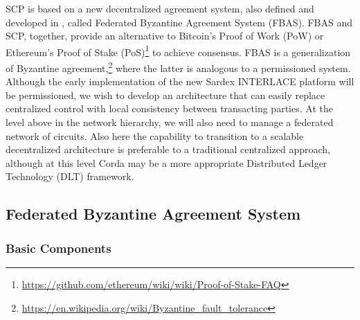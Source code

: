 SCP is based on a new decentralized agreement system, also defined and developed in \cite{Mazieres2016}, called Federated Byzantine Agreement System (FBAS). FBAS and SCP, together, provide an alternative to Bitcoin's Proof of Work (PoW) \cite{Antonopoulos2015} or Ethereum's Proof of Stake (PoS)\footnote{\url{https://github.com/ethereum/wiki/wiki/Proof-of-Stake-FAQ}} to achieve consensus. FBAS is a generalization of Byzantine agreement,\footnote{\url{https://en.wikipedia.org/wiki/Byzantine_fault_tolerance}} where the latter is analogous to a permissioned system. Although the early implementation of the new Sardex INTERLACE platform will be permissioned, we wish to develop an architecture that can easily replace centralized control with local consistency between transacting parties. At the level above in the network hierarchy, we will also need to manage a federated network of circuits. Also here the capability to transition to a scalable decentralized architecture is preferable to a traditional centralized approach, although at this level Corda may be a more appropriate Distributed Ledger Technology (DLT) framework.

\subsection{Federated Byzantine Agreement System}
\subsubsection{Basic Components\\}

